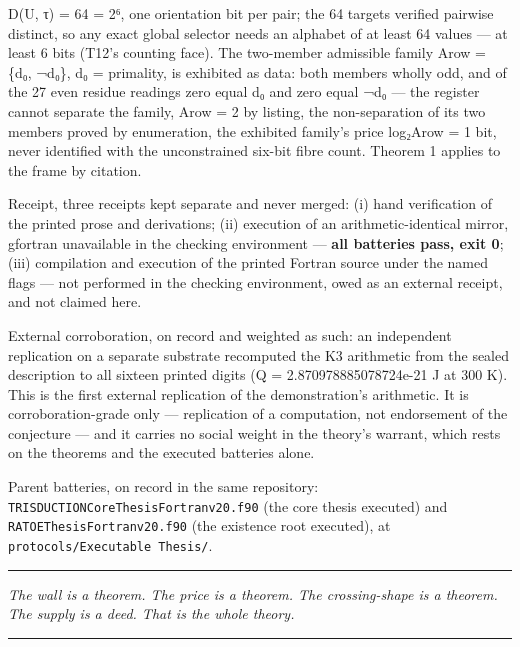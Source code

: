 \documentclass[10pt]{article}
\renewcommand{\_}{\origunderscore\allowbreak}
\begin{document}
\begin{itemize}
  \textbar D(U, τ)\textbar{} = 64 = 2⁶, one orientation bit per pair;
  the 64 targets verified pairwise distinct, so any exact global
  selector needs an alphabet of at least 64 values --- at least 6 bits
  (T12's counting face). The two-member admissible family A\_row = \{d₀,
  ¬d₀\}, d₀ = primality, is exhibited as data: both members wholly odd,
  and of the 27 even residue readings zero equal d₀ and zero equal ¬d₀
  --- the register cannot separate the family, \textbar A\_row\textbar{}
  = 2 by listing, the non-separation of its two members proved by
  enumeration, the exhibited family's price
  log₂\textbar A\_row\textbar{} = 1 bit, never identified with the
  unconstrained six-bit fibre count. Theorem 1 applies to the frame by
  citation.
\end{itemize}

Receipt, three receipts kept separate and never merged: (i) hand
verification of the printed prose and derivations; (ii) execution of an
arithmetic-identical mirror, gfortran unavailable in the checking
environment --- \textbf{all batteries pass, exit 0}; (iii) compilation
and execution of the printed Fortran source under the named flags ---
not performed in the checking environment, owed as an external receipt,
and not claimed here.

External corroboration, on record and weighted as such: an independent
replication on a separate substrate recomputed the K3 arithmetic from
the sealed description to all sixteen printed digits (Q =
2.870978885078724e-21 J at 300 K). This is the first external
replication of the demonstration's arithmetic. It is corroboration-grade
only --- replication of a computation, not endorsement of the conjecture
--- and it carries no social weight in the theory's warrant, which rests
on the theorems and the executed batteries alone.

Parent batteries, on record in the same repository:
\texttt{TRISDUCTION\_Core\_Thesis\_Fortran\_v2\_4\_0.f90} (the core
thesis executed) and \texttt{RA\_TOE\_Thesis\_Fortran\_v2\_0\_0.f90}
(the existence root executed), at
\texttt{protocols/Executable\ Thesis/}.

\begin{center}\rule{0.5\linewidth}{0.5pt}\end{center}

\emph{The wall is a theorem. The price is a theorem. The crossing-shape
is a theorem. The supply is a deed. That is the whole theory.}

\begin{center}\rule{0.5\linewidth}{0.5pt}\end{center}
\end{document}
